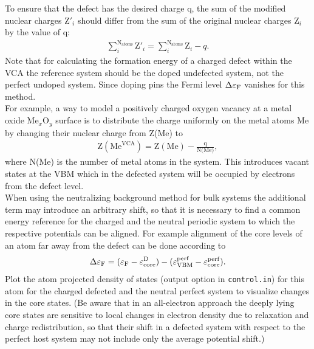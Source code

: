 To ensure that the defect has the desired charge q, the sum of the modified nuclear charges $\text{Z}'_i$  should differ from the sum of the original nuclear charges $\text{Z}_i$ by the value of q:
\begin{eqnarray*}
\sum_i^{\text{N}_{\text{atoms}}}\text{Z}'_i= \sum_i^{\text{N}_{\text{atoms}}}\text{Z}_i-q.
\end{eqnarray*}
Note that for calculating the formation energy of a charged defect within the VCA the reference system should be the doped undefected system, not the perfect undoped system.
Since doping pins the Fermi level $\Delta {\varepsilon}_{\text{F}}$ vanishes for this method.\\  
For example, a way to model a positively charged oxygen vacancy at a metal oxide Me$_x$O$_y$ surface is to distribute the charge uniformly on the metal atoms Me by changing their nuclear charge from Z(Me) to 
\begin{eqnarray*}
\text{Z}(\text{Me}^{\text{VCA}})=\text{Z}(\text{Me})-\frac{\text{q}}{\text{N(Me)}},
\end{eqnarray*}
where N(Me) is the number of metal atoms in the system. This introduces vacant states at the VBM which in the defected system will be occupied by electrons from the defect level.  \\
When using the neutralizing background method for bulk systems the additional term may introduce an arbitrary shift, so that it is necessary to find a common energy reference for the charged and the neutral periodic
system to which the respective potentials can be aligned. 
For example alignment of the core levels of an atom far away from the defect can be done according to
\begin{eqnarray*}
\Delta{\varepsilon}_{\text{F}}=({\varepsilon}_{\text{F}}-{\varepsilon}_{\text{core}}^{\text{D}})-({\varepsilon}_{\text{VBM}}^{\text{perf}}-{\varepsilon}_{\text{core}}^{\text{perf}}).
\end{eqnarray*}
 Plot the atom projected density of states (output option   in \texttt{control.in}) for this atom for the charged defected and the neutral perfect system to visualize changes in the core states. (Be aware that in an all-electron approach the deeply lying core states are sensitive to local changes in electron density due to relaxation and
charge redistribution, so that their shift in a defected system with respect to the perfect
host system may not include only the average potential shift.)\\
